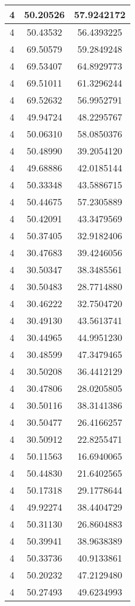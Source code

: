 \documentclass[
]{book}
\begin{document}
\begin{tabular}{c|c|c}
\hline
4 & 50.20526 & 57.9242172\\
\hline
4 & 50.43532 & 56.4393225\\
\hline
4 & 69.50579 & 59.2849248\\
\hline
4 & 69.53407 & 64.8929773\\
\hline
4 & 69.51011 & 61.3296244\\
\hline
4 & 69.52632 & 56.9952791\\
\hline
4 & 49.94724 & 48.2295767\\
\hline
4 & 50.06310 & 58.0850376\\
\hline
4 & 50.48990 & 39.2054120\\
\hline
4 & 49.68886 & 42.0185144\\
\hline
4 & 50.33348 & 43.5886715\\
\hline
4 & 50.44675 & 57.2305889\\
\hline
4 & 50.42091 & 43.3479569\\
\hline
4 & 50.37405 & 32.9182406\\
\hline
4 & 30.47683 & 39.4246056\\
\hline
4 & 30.50347 & 38.3485561\\
\hline
4 & 30.50483 & 28.7714880\\
\hline
4 & 30.46222 & 32.7504720\\
\hline
4 & 30.49130 & 43.5613741\\
\hline
4 & 30.44965 & 44.9951230\\
\hline
4 & 30.48599 & 47.3479465\\
\hline
4 & 30.50208 & 36.4412129\\
\hline
4 & 30.47806 & 28.0205805\\
\hline
4 & 30.50116 & 38.3141386\\
\hline
4 & 30.50477 & 26.4166257\\
\hline
4 & 30.50912 & 22.8255471\\
\hline
4 & 50.11563 & 16.6940065\\
\hline
4 & 50.44830 & 21.6402565\\
\hline
4 & 50.17318 & 29.1778644\\
\hline
4 & 49.92274 & 38.4404729\\
\hline
4 & 50.31130 & 26.8604883\\
\hline
4 & 50.39941 & 38.9638389\\
\hline
4 & 50.33736 & 40.9133861\\
\hline
4 & 50.20232 & 47.2129480\\
\hline
4 & 50.27493 & 49.6234993\\

\end{tabular}
\end{document}
